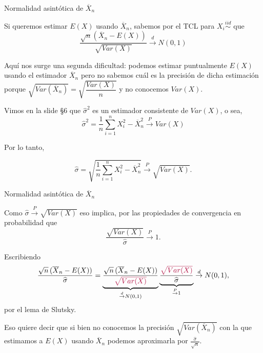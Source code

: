 \documentclass{beamer}
\theoremstyle{definition}
\newcommand{\cp}{\overset{P}{\rightarrow}}
\newcommand{\cw}{\overset{d}{\rightarrow}}
\begin{document}
\begin{frame}{\color{rosee}Normalidad asintótica de $\overline{X}_n$}\small

Si queremos estimar $E(X)$ usando $\overline{X}_n$, sabemos por el TCL para $X_i\stackrel{iid}{\sim}$ que \[\dfrac{\sqrt{n}(\overline{X}_n-E(X))}{\sqrt{Var(X)}}\cw N(0,1)\]

Aquí nos surge una segunda dificultad: podemos estimar puntualmente $E(X)$ usando el estimador $\overline{X}_n$ pero no sabemos cuál es la precisión de dicha estimación porque $\sqrt{Var(\overline{X}_n)}=\sqrt{\dfrac{Var(X)}{n}}$ y no conocemos $Var(X)$.

Vimos en la slide \S6 que $\widehat{\sigma}^{2}$ es un estimador consistente de $Var(X)$, o sea,
  \[\widehat{\sigma}^{2}= \frac{1}{n}\sum\limits_{i=1}^nX_{i}^{2} - 
  \overline{X}_n^{2} \cp Var(X)\]
  
  Por lo tanto, 
  
  \[\widehat{\sigma} =\sqrt{\frac{1}{n}\sum\limits_{i=1}^nX_{i}^{2} - 
  \overline{X}_n^{2}}\cp \sqrt{Var(X)}.\]
  
 
\end{frame}



\begin{frame}{\color{rosee}Normalidad asintótica de $\overline{X}_n$}
 
  Como $\widehat{\sigma} \cp \sqrt{Var(X)}$ eso implica, por las propiedades de convergencia en probabilidad que
  \[\frac{\sqrt{Var(X)}}{\widehat{\sigma}} \cp 1.\] 
  
  Escribiendo
  \[\frac{\sqrt{n}\,(\overline{X}_n-E(X))}{\widehat{\sigma}} =
  \underbrace{\frac{\sqrt{n}\,(\overline{X}_n-E(X))}{\color{rosee}\sqrt{Var(X)}}}_{\cw
    N(0,1) } \underbrace{\frac{\color{rosee}\sqrt{Var(X)}}{\widehat{\sigma}}
  }_{\cp 1} \cw N(0,1),\] por el lema de Slutsky.
  
  Eso quiere decir que si bien no conocemos la precisión $\sqrt{Var(\overline{X}_n)}$ con la que estimamos a $E(X)$ usando $\overline{X}_n$ podemos aproximarla por $\frac{\widehat{\sigma}}{\sqrt{n}}$.
\end{frame}






\end{document}
